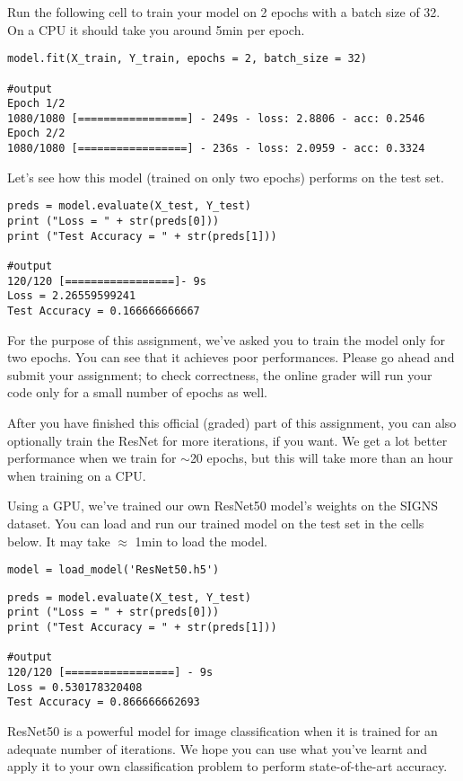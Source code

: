 Run the following cell to train your model on 2 epochs with a batch size of 32. On a CPU it should take you around 5min per epoch.
\begin{verbatim}
model.fit(X_train, Y_train, epochs = 2, batch_size = 32)

#output
Epoch 1/2
1080/1080 [=================] - 249s - loss: 2.8806 - acc: 0.2546   
Epoch 2/2
1080/1080 [=================] - 236s - loss: 2.0959 - acc: 0.3324   
\end{verbatim}

Let's see how this model (trained on only two epochs) performs on the test set.

\begin{verbatim}
preds = model.evaluate(X_test, Y_test)
print ("Loss = " + str(preds[0]))
print ("Test Accuracy = " + str(preds[1]))

#output
120/120 [=================]- 9s     
Loss = 2.26559599241
Test Accuracy = 0.166666666667
\end{verbatim}


For the purpose of this assignment, we've asked you to train the model only for two epochs. You can see that it achieves poor performances. Please go ahead and submit your assignment; to check correctness, the online grader will run your code only for a small number of epochs as well.

After you have finished this official (graded) part of this assignment, you can also optionally train the ResNet for more iterations, if you want. We get a lot better performance when we train for $\sim$20 epochs, but this will take more than an hour when training on a CPU.

Using a GPU, we've trained our own ResNet50 model's weights on the SIGNS dataset. You can load and run our trained model on the test set in the cells below. It may take $\approx$ 1min to load the model.

\begin{verbatim}
model = load_model('ResNet50.h5') 
\end{verbatim}

\begin{verbatim}
preds = model.evaluate(X_test, Y_test)
print ("Loss = " + str(preds[0]))
print ("Test Accuracy = " + str(preds[1]))

#output
120/120 [=================] - 9s     
Loss = 0.530178320408
Test Accuracy = 0.866666662693
\end{verbatim}

ResNet50 is a powerful model for image classification when it is trained for an adequate number of iterations. We hope you can use what you've learnt and apply it to your own classification problem to perform state-of-the-art accuracy.


